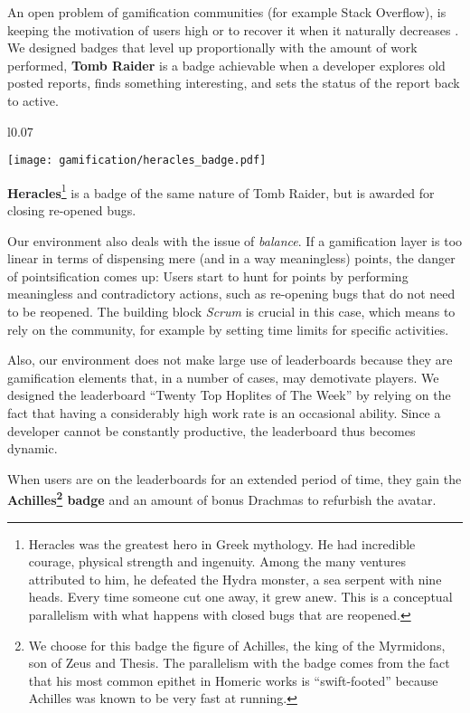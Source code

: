  An open problem of gamification communities (for example Stack Overflow), is keeping the motivation of users high or to recover it when it naturally decreases \cite{Grant2013}.
We designed badges that level up proportionally with the amount of work performed, \eg \textbf{Tomb Raider} is a badge achievable when a developer explores old posted reports, finds something interesting, and sets the status of the report back to active.

\noindent
\begin{wrapfigure}{l}{0.07\textwidth}
  \vspace{-18pt}
  \begin{center}
    \texttt{[image: gamification/heracles\_badge.pdf]}
  \end{center}
  \vspace{-30pt}
\end{wrapfigure}
\textbf{Heracles}\footnote{Heracles was the greatest hero in Greek mythology.
He had incredible courage, physical strength and ingenuity.
Among the many ventures attributed to him, he defeated the Hydra monster, a sea serpent with nine heads.
Every time someone cut one away, it grew anew.
This is a conceptual parallelism with what happens with closed bugs that are reopened.} is a badge of the same nature of Tomb Raider, but is awarded for closing re-opened bugs.

\pagebreak
Our environment also deals with the issue of {\em balance}.
If a gamification layer is too linear in terms of dispensing mere (and in a way meaningless) points, the danger of pointsification comes up: Users start to hunt for points by performing meaningless and contradictory actions, such as re-opening bugs that do not need to be reopened.
The building block {\em Scrum} is crucial in this case, which means to rely on the community, for example by setting time limits for specific activities.

Also, our environment does not make large use of leaderboards because they are gamification elements that, in a number of cases, may demotivate players.
We designed the leaderboard ``Twenty Top Hoplites of The Week'' by relying on the fact that having a considerably high work rate is an occasional ability.
Since a developer cannot be constantly productive, the leaderboard thus becomes dynamic.

 When users are on the leaderboards for an extended period of time, they gain the \textbf{Achilles\footnote{We choose for this badge the figure of Achilles, the king of the Myrmidons, son of Zeus and Thesis.
The parallelism with the badge comes from the fact that his most common epithet in Homeric works is ``swift-footed'' because Achilles was known to be very fast at running.} badge} and an amount of bonus Drachmas to refurbish the avatar.

